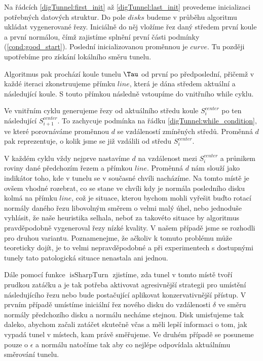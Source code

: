 Na řádcích \ref{digTunnel:first_init} až \ref{digTunnel:last_init} provedeme
inicializaci potřebných datových struktur. Do pole $ disks $ budeme
v průběhu algoritmu ukládat vygenerované řezy. Iniciálně do něj vložíme
řez daný středem první koule a první normálou, čímž zajistíme splnění první
části podmínky (\ref{cond:good_start}). Poslední inicializovanou proměnnou je
$ curve $. Tu později upotřebíme pro získání lokálního směru tunelu.

Algoritmus pak prochází koule tunelu $ \Tau $ od první po předposlední, přičemž
v každé iteraci zkonstruujeme přímku $ line $, která je dána středem aktuální
a následující koule. S touto přímkou následně vstoupíme do vnitřního while cyklu.

Ve vnitřním cyklu generujeme řezy od aktuálního středu koule $ S_{i}^{center} $
po ten následující $ S_{i + 1}^{center} $. To zachycuje podmínka
na řádku \ref{digTunnel:while_condition}, ve které porovnáváme
proměnnou $ d $ se vzdáleností zmíněných středů. Proměnná $ d $ pak reprezentuje,
o kolik jsme se již vzdálili od středu $ S_{i}^{center} $.

V každém cyklu vždy nejprve nastavíme $ d $ na vzdálenost mezi $ S_{i}^{center} $ a
průnikem roviny dané předchozím řezem a přímkou $ line $. Proměnná $ d $ nám
slouží jako indikátor toho, kde v tunelu se v současné chvíli nacházíme.
Na tomto místě je ovšem vhodné rozebrat, co se stane ve chvíli kdy je normála
posledního disku kolmá na přímku $ line $, což je situace, kterou bychom mohli
vyřešit buďto rotací normály daného řezu libovolným směrem o velmi malý úhel,
nebo jednoduše vyhlásit, že naše heuristika selhala, neboť za
takovéto situace by algoritmus pravděpodobně vygeneroval řezy nízké kvality.
V našem případě jsme se rozhodli pro druhou variantu.
Poznamenejme, že ačkoliv k tomuto problému může teoreticky dojít, je to
velmi nepravděpodobné a při experimentech s dostupnými tunely tato patologická
situace nenastala ani jednou.

Dále pomocí funkce $ \operatorname{isSharpTurn} $ zjistíme, zda tunel v tomto
místě tvoří prudkou zatáčku a je tak potřeba aktivovat agresivnější strategii pro
umístění následujícího řezu nebo bude postačující aplikovat konzervativnější
přístup. V prvním případě umístíme iniciální řez nového disku do vzdálenosti
$ \delta $ ve směru normály předchozího disku a normálu necháme stejnou. Disk
umisťujeme tak daleko, abychom začali zatáčet skutečně včas a měli lepší
informaci o tom, jak vypadá tunel v místech, kam právě směřujeme. Ve druhém případě
se posuneme pouze o $ \epsilon $ a normálu natočíme tak aby co nejlépe odpovídala
aktuálnímu směrování tunelu.

